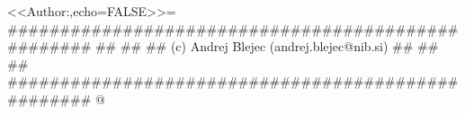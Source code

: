 %
\usepackage[cp1250]{inputenc} %
<<Author:,echo=FALSE>>=
###################################################
##                                               ##
## (c) Andrej Blejec (andrej.blejec@nib.si)      ##
##                                               ##
###################################################
@
